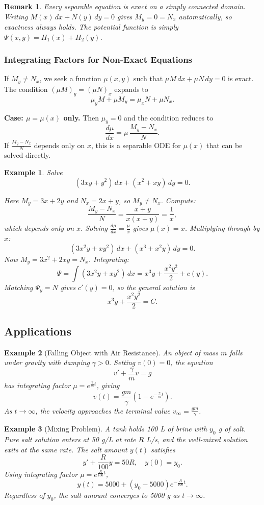 \documentclass{article}
\newtheorem*{example}{Example}
\newtheorem{remark}{Remark}
\begin{document}
\begin{remark}
    Every separable equation is exact on a simply connected domain. Writing $M(x)\,dx + N(y)\,dy = 0$ gives $M_y = 0 = N_x$ automatically, so exactness always holds. The potential function is simply $\Psi(x,y) = H_1(x) + H_2(y)$.
\end{remark}

\subsubsection{Integrating Factors for Non-Exact Equations}
If $M_y \neq N_x$, we seek a function $\mu(x,y)$ such that $\mu M\,dx + \mu N\,dy = 0$ is exact. The condition $(\mu M)_y = (\mu N)_x$ expands to
\[\mu_y M + \mu M_y = \mu_x N + \mu N_x.\]

\textbf{Case: $\mu = \mu(x)$ only.} Then $\mu_y = 0$ and the condition reduces to
\[\frac{d\mu}{dx} = \mu\,\frac{M_y - N_x}{N}.\]
If $\frac{M_y - N_x}{N}$ depends only on $x$, this is a separable ODE for $\mu(x)$ that can be solved directly.
\begin{example}
    Solve
    \[(3xy + y^2)\,dx + (x^2 + xy)\,dy = 0.\]

    Here $M_y = 3x+2y$ and $N_x = 2x+y$, so $M_y \neq N_x$. Compute:
    \[\frac{M_y - N_x}{N} = \frac{x+y}{x(x+y)} = \frac{1}{x},\]
    which depends only on $x$. Solving $\frac{d\mu}{dx} = \frac{\mu}{x}$ gives $\mu(x) = x$. Multiplying through by $x$:
    \[(3x^2y+xy^2)\,dx + (x^3+x^2y)\,dy = 0.\]
    Now $M_y = 3x^2+2xy = N_x$. \checkmark \; Integrating:
    \[\Psi = \int(3x^2y+xy^2)\,dx = x^3y + \frac{x^2y^2}{2} + c(y).\]
    Matching $\Psi_y = N$ gives $c'(y) = 0$, so the general solution is
    \[x^3y + \frac{x^2y^2}{2} = C.\]
\end{example}

\subsection{Applications}
\begin{example}[Falling Object with Air Resistance]
    An object of mass $m$ falls under gravity with damping 
    $\gamma > 0$. Setting $v(0) = 0$, the equation
    \[v' + \frac{\gamma}{m}v = g\]
    has integrating factor $\mu = e^{\frac{\gamma}{m}t}$, giving
    \[v(t) = \frac{gm}{\gamma}\left(1 - e^{-\frac{\gamma}{m}t}
    \right).\]
    As $t\to\infty$, the velocity approaches the terminal value 
    $v_\infty = \frac{gm}{\gamma}$.
\end{example}
\begin{example}[Mixing Problem]
    A tank holds 100 L of brine with $y_0$ g of salt. Pure salt 
    solution enters at 50 g/L at rate $R$ L/s, and the well-mixed 
    solution exits at the same rate. The salt amount $y(t)$ satisfies
    \[y' + \frac{R}{100}y = 50R, \quad y(0) = y_0.\]
    Using integrating factor $\mu = e^{\frac{R}{100}t}$,
    \[y(t) = 5000 + (y_0-5000)e^{-\frac{R}{100}t}.\]
    Regardless of $y_0$, the salt amount converges to 5000 g as 
    $t\to\infty$.
\end{example}
\end{document}
